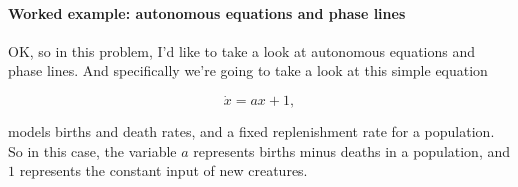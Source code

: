 \paragraph{Worked example: autonomous equations and phase lines}

OK, so in this problem, I'd like to take
a look at autonomous equations and phase lines.
And specifically we're going to take a look
at this simple equation

\begin{equation*}
  \dot x = ax + 1, 
\end{equation*}

 models births and death rates, and a fixed replenishment rate for a population.
So in this case, the variable $a$ represents births minus deaths in a population,
and $1$ represents the constant input of new creatures.

